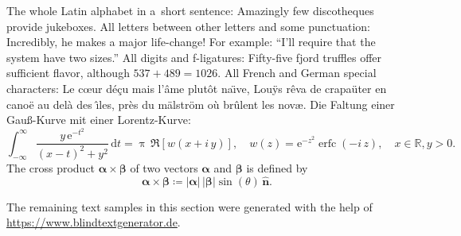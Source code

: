 \documentclass[11pt, a4paper, oneside]{article}
\theoremstyle{Plain}
\theoremstyle{Definition}
\theoremstyle{Remark}
\begin{document}
The whole Latin alphabet in a~short sentence: Amazingly few discotheques provide jukeboxes. All letters between other letters and some punctuation: Incredibly, he makes a major life-change! For example: ``I'll require that the system have two sizes.'' All digits and f-ligatures: Fifty-five fjord truffles offer sufficient flavor, although ${537 + 489 = 1026}$. All French and German special characters: Le c\oe ur d\'e\c cu mais l'\^ame plut\^ot na\"\i ve, Lou\"ys r\^eva de crapa\"uter en cano\"e au del\`a des \^\i les, pr\`es du m\"alstr\"om o\`u br\^ulent les nov\ae. Die Faltung einer Gau\ss-Kurve mit einer Lorentz-Kurve:
\begin{equation}
\int_{-\infty}^\infty \frac{y\,\mathrm{e}^{-t^2}}{(x-t)^2+y^2}\,\mathrm{d} t =
\uppi \, \Re[w(x + i\,y)], \quad w(z) = \mathrm{e}^{-z^2} \operatorname{erfc}(-i\, z), \quad x \in \mathbb{R}, y>0.
\end{equation}
The cross product $\bm{\alpha} \times \bm{\beta}$ of two vectors $\bm{\alpha}$ and $\bm{\beta}$ is defined by
\begin{equation}
	\bm{\alpha} \times \bm{\beta} \coloneq |\bm{\alpha}| \, |\bm{\beta}| \sin (\theta) \, \hat{\bm{n}}.
\end{equation}

The remaining text samples in this section were generated with the help of \url{https://www.blindtextgenerator.de}.
\end{document}
